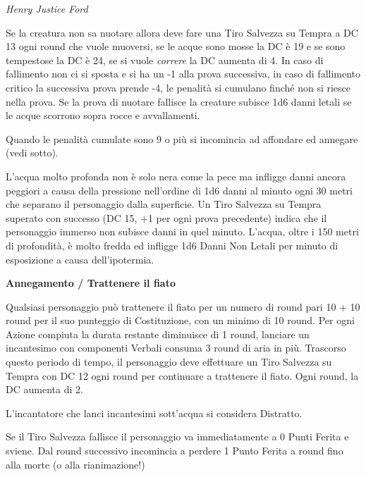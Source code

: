 \begin{multicols}{2}
\begin{center}
	\emph{Henry Justice Ford}\end{center}

\medskip

Se la creatura non sa nuotare allora deve fare una Tiro Salvezza su Tempra a DC 13 ogni round che vuole muoversi, se le acque sono mosse la DC è 19 e se sono tempestose la DC è 24, se si vuole \emph{correre} la DC aumenta di 4.
In caso di fallimento non ci si sposta e si ha un -1 alla prova successiva, in caso di fallimento critico la successiva prova prende -4, le penalità si cumulano finché non si riesce nella prova.
Se la prova di nuotare fallisce la creature subisce 1d6 danni letali se le acque scorrono sopra rocce e avvallamenti.

Quando le penalità cumulate sono 9 o più si incomincia ad affondare ed annegare (vedi sotto).

L'acqua molto profonda non è solo nera come la pece ma infligge danni ancora peggiori a causa della pressione nell'ordine di 1d6 danni al minuto ogni 30 metri che separano il personaggio dalla superficie. Un Tiro Salvezza su Tempra superato con successo (DC 15, +1 per ogni prova precedente) indica che il personaggio immerso non subisce danni in quel minuto. L'acqua, oltre i 150 metri di profondità, è molto fredda ed infligge 1d6 Danni Non Letali per minuto di esposizione a causa dell'ipotermia.

\medskip

\textbf{Annegamento / Trattenere il fiato}\hypertarget{trattenereilfiato}{}\label{trattenereilfiato}

\medskip

Qualsiasi personaggio può trattenere il fiato per un numero di round pari 10 + 10 round per il suo punteggio di Costituzione, con un minimo di 10 round. Per ogni Azione compiuta la durata restante diminuisce di 1 round, lanciare un incantesimo con componenti Verbali consuma 3 round di aria in più. Trascorso questo periodo di tempo, il personaggio deve effettuare un Tiro Salvezza su Tempra con DC 12 ogni round per continuare a trattenere il fiato. Ogni round, la DC aumenta di 2.

L'incantatore che lanci incantesimi sott'acqua si considera Distratto.

Se il Tiro Salvezza fallisce il personaggio va immediatamente a 0 Punti Ferita e sviene. Dal round successivo incomincia a perdere 1 Punto Ferita a round fino alla morte (o alla rianimazione!)


\end{multicols}
